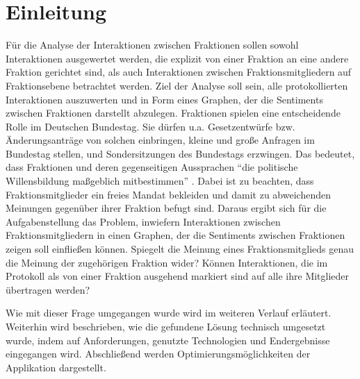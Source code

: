 \section{Einleitung}\label{sec:06_01_einleitung}
Für die Analyse der Interaktionen zwischen Fraktionen sollen sowohl Interaktionen ausgewertet werden, die explizit von einer Fraktion an eine andere Fraktion gerichtet sind, als auch Interaktionen zwischen Fraktionsmitgliedern auf Fraktionsebene betrachtet werden. Ziel der Analyse soll sein, alle protokollierten Interaktionen auszuwerten und in Form eines Graphen, der die Sentiments zwischen Fraktionen darstellt abzulegen.
Fraktionen spielen eine entscheidende Rolle im Deutschen Bundestag. Sie dürfen u.a. Gesetzentwürfe bzw. Änderungsanträge von solchen einbringen, kleine und große Anfragen im Bundestag stellen, und Sondersitzungen des Bundestags erzwingen. Das bedeutet, dass Fraktionen und deren gegenseitigen Aussprachen ``die politische Willensbildung maßgeblich mitbestimmen'' \cite{factionsbpp}.
Dabei ist zu beachten, dass Fraktionsmitglieder ein freies Mandat bekleiden und damit zu abweichenden Meinungen gegenüber ihrer Fraktion befugt sind. \cite{abgeordneterbpp} Daraus ergibt sich für die Aufgabenstellung das Problem, inwiefern Interaktionen zwischen Fraktionsmitgliedern in einen Graphen, der die Sentiments zwischen Fraktionen zeigen soll einfließen können. Spiegelt die Meinung eines Fraktionsmitglieds genau die Meinung der zugehörigen Fraktion wider? Können Interaktionen, die im Protokoll als von einer Fraktion ausgehend markiert sind auf alle ihre Mitglieder übertragen werden?

Wie mit dieser Frage umgegangen wurde wird im weiteren Verlauf erläutert. Weiterhin wird beschrieben, wie die gefundene Lösung technisch umgesetzt wurde, indem auf Anforderungen, genutzte Technologien und Endergebnisse eingegangen wird. Abschließend werden Optimierungsmöglichkeiten der Applikation dargestellt.